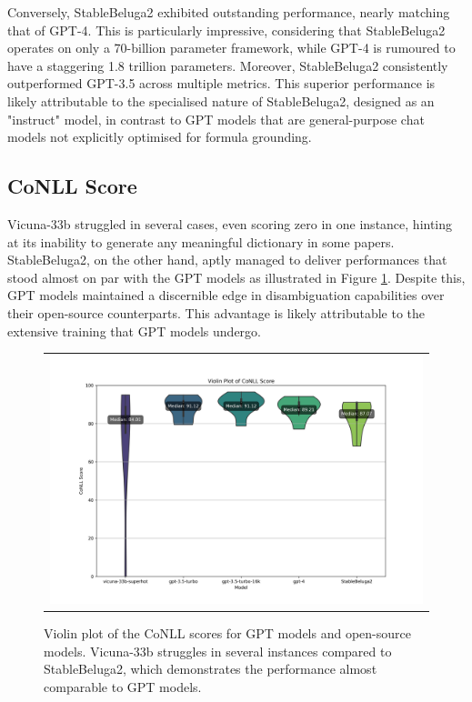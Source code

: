 Conversely, StableBeluga2 exhibited outstanding performance, nearly matching that of GPT-4. This is particularly impressive, considering that StableBeluga2 operates on only a 70-billion parameter framework, while GPT-4 is rumoured to have a staggering 1.8 trillion parameters. Moreover, StableBeluga2 consistently outperformed GPT-3.5 across multiple metrics. This superior performance is likely attributable to the specialised nature of StableBeluga2, designed as an "instruct" model, in contrast to GPT models that are general-purpose chat models not explicitly optimised for formula grounding.

\subsection{CoNLL Score}

Vicuna-33b struggled in several cases, even scoring zero in one instance, hinting at its inability to generate any meaningful dictionary in some papers. StableBeluga2, on the other hand, aptly managed to deliver performances that stood almost on par with the GPT models as illustrated in Figure \ref{fig:open-source-conll}. Despite this, GPT models maintained a discernible edge in disambiguation capabilities over their open-source counterparts. This advantage is likely attributable to the extensive training that GPT models undergo.

\begin{figure}[htpb]
  \centering
  \begin{tabular}{c}
  \includegraphics[width=14cm]{images/open-conll-score.png}
  \end{tabular}
  \caption[CoNLL Score Open Source]{Violin plot of the CoNLL scores for GPT models and open-source models. Vicuna-33b struggles in several instances compared to StableBeluga2, which demonstrates the performance almost comparable to GPT models.}\label{fig:open-source-conll}
\end{figure}

